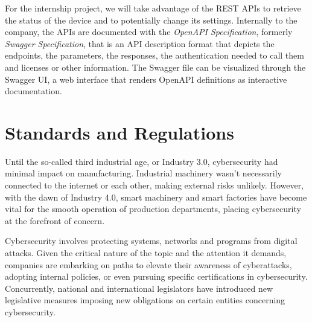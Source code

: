 For the internship project, we will take advantage of the REST APIs to retrieve the status of the device and to potentially change its settings. Internally to the company, the APIs are documented with the \textit{OpenAPI Specification}, formerly \textit{Swagger Specification}, that is an API description format that depicts the endpoints, the parameters, the responses, the authentication needed to call them and licenses or other information. The Swagger file can be visualized through the Swagger UI, a web interface that renders OpenAPI definitions as interactive documentation.~\cite{openapi-swagger}


\section{Standards and Regulations}
Until the so-called third industrial age, or Industry 3.0, cybersecurity had minimal impact on manufacturing. Industrial machinery wasn't necessarily connected to the internet or each other, making external risks unlikely. However, with the dawn of Industry 4.0, smart machinery and smart factories have become vital for the smooth operation of production departments, placing cybersecurity at the forefront of concern.

Cybersecurity involves protecting systems, networks and programs from digital attacks. Given the critical nature of the topic and the attention it demands, companies are embarking on paths to elevate their awareness of cyberattacks, adopting internal policies, or even pursuing specific certifications in cybersecurity. Concurrently, national and international legislators have introduced new legislative measures imposing new obligations on certain entities concerning cybersecurity.

